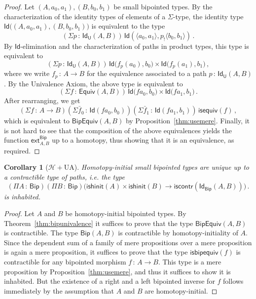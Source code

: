 \documentclass[10pt,a4paper,oneside,reqno]{amsart}
\numberwithin{equation}{section}
\theoremstyle{mythm}
\newtheorem{corollary}[theorem]{Corollary}
\theoremstyle{mydef}
\theoremstyle{myrmk}
\newcommand{\co}{\,{:}\,}
\newcommand{\Hint}{\mathcal{H}}
\newcommand{\iscontr}{\mathsf{iscontr}}
\newcommand{\isequiv}{\mathsf{isequiv}}
\newcommand{\isbiphinit}{\mathsf{ishinit}}
\newcommand{\Eq}{\mathsf{Equiv}}
\newcommand{\ext}{\mathsf{ext}}
\newcommand{\Id}{\mathsf{Id}}
\newcommand{\U}{\mathsf{U}}
\newcommand{\Bip}{\mathsf{Bip}}
\newcommand{\BipHom}{\mathsf{Bip}}
\newcommand{\isbipequiv}{\mathsf{isbipequiv}}
\newcommand{\BipEquiv}{\mathsf{BipEquiv}}
\begin{document}
\begin{proof} 
Let $ (A,a_0,a_1), (B,b_0,b_1)$ be small bipointed types. By the characterization of the identity types
of  elements of a $\Sigma$-type, the 
identity type $\Id\big( (A,a_0,a_1),  (B,b_0,b_1)\big)$ is equivalent to  the type
\[
(\Sigma p \co \Id_\U(A,B))  \, \Id(\langle a_0,a_1 \rangle,  p_{!} \langle b_0,b_1\rangle)  \, .
\]
By $\Id$-elimination and the characterization of paths in product types, this type is equivalent to
\[ 
(\Sigma p \co \Id_\U(A,B)) \, \Id \big( f_p(a_0),  b_0\big) \times \Id \big( f_p(a_1) , b_1) \, ,
 \]
where we write $f_p \co A \to B$ for the equivalence associated to a path $p \co \Id_\U(A,B)$.  By the Univalence Axiom,
the above type is equivalent to
\[ 
(\Sigma f \co \Eq(A,B)) \, \Id \big( f a_0 ,  b_0\big) \times \Id \big( f a_1 , b_1\big)  \, .
\]
After rearranging, we get
\[
(\Sigma f  \co A \to B)(\Sigma \bar{f}_0 \co \Id( fa_0, b_0)) (\Sigma \bar{f}_1 \co \Id( fa_1, b_1))  \, \isequiv(f) \, ,
\]
which is equivalent to $\BipEquiv(A,B)$ by Proposition~\ref{thm:usemere}. Finally, it is not hard to see that the composition of the above equivalences yields the  function $\ext^{\Bip}_{A,B}$ up to a homotopy, thus showing that it is an equivalence, as required.
\end{proof} 

\begin{corollary}[$\Hint + \mathrm{UA}$] \label{BoolHInitIso} 
Homotopy-initial small bipointed types are unique up to a contractible type of paths, i.e. the type
\[ 
(\Pi A \co \Bip) (\Pi B \co \Bip)
\big( \isbiphinit(A) \times \isbiphinit(B) \to \iscontr(\Id_\Bip(A,B)) \big) \, .
\] 
is inhabited.
\end{corollary}

\begin{proof} Let $A$ and $B$ be homotopy-initial bipointed types. 
By Theorem~\ref{thm:bipunivalence} it suffices to prove that the type $\BipEquiv(A,B)$ is contractible. The type 
$\BipHom( A, B)$ is contractible by homotopy-initiality of $A$. Since the dependent sum of a family of mere propositions over a mere proposition is again a mere proposition, it suffices to prove that the type $\isbipequiv(f)$ is contractible for any bipointed morphism $f \co A \to B$. This type is a mere proposition by 
Proposition~\ref{thm:usemere}, and thus it suffices to show it is inhabited. But the existence of a right and a left bipointed inverse for $f$ follows immediately
by the assumption that $A$ and $B$ are homotopy-initial.
\end{proof}
\end{document}
